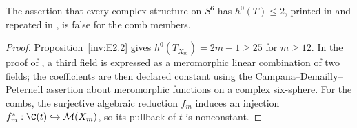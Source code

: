 \begin{proposition}\hypertarget{tag-01SX}{}\label{inv:E2.4}

The assertion that every complex structure on $S^6$ has
$h^0(T)\le2$, printed in
\citet[Corollary~1.3, preprint p.~2]{HKP2000}
and repeated in \citet[Remarks 1.2 and 9.26]{AC2026}, is false
for the comb members.
\end{proposition}


\begin{proof}
Proposition~\ref{inv:E2.2} gives $h^0(T_{X_m})=2m+1\ge25$ for $m\ge12$.
In the proof of \citet[Corollary~1.3, preprint p.~2]{HKP2000},
a third field is expressed as a meromorphic linear combination of two fields;
the coefficients are then declared constant using the
Campana--Demailly--Peternell assertion about meromorphic functions on a
complex six-sphere. For the combs, the surjective algebraic reduction
$f_m$ induces an injection $f_m^*:\C(t)\hookrightarrow\mathcal M(X_m)$,
so its pullback of $t$ is nonconstant.
\end{proof}